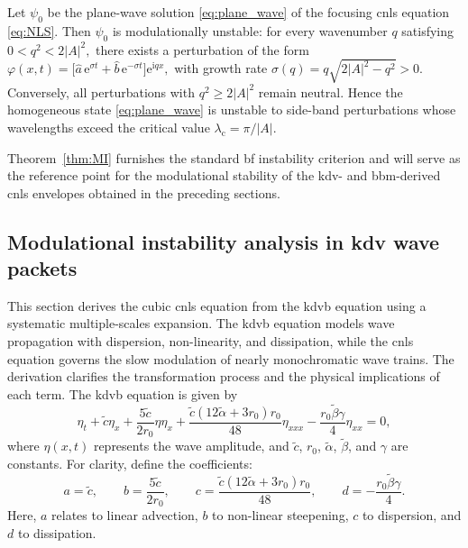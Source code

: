 \documentclass[alpha-refs, 12pt]{wiley-article}
\begin{document}
\begin{theorem}\label{thm:MI}
  Let $\psi_{0}$ be the plane-wave solution \eqref{eq:plane_wave} of the
  focusing \acrshort{cnls} equation \eqref{eq:NLS}. Then $\psi_{0}$ is modulationally unstable: for every wavenumber $q$ satisfying
  \(
    0<q^{2}<2|A|^{2},
  \)
  there exists a perturbation of the form
  \(
    \displaystyle
    \varphi(x,t)=\bigl[\hat{a}\,\mathrm{e}^{\sigma t}
                     +\hat{b}\,\mathrm{e}^{-\sigma t}\bigr]
                 \mathrm{e}^{\mathrm{i}qx},
  \)
  with growth rate
  \(
    \displaystyle
    \sigma(q)=q\sqrt{2|A|^{2}-q^{2}}>0.
  \)
  Conversely, all perturbations with $q^{2}\ge2|A|^{2}$ remain
  neutral. Hence the homogeneous state \eqref{eq:plane_wave} is unstable
  to side-band perturbations whose wavelengths exceed the critical value
  \(
    \lambda_{\mathrm{c}}=\pi/|A|.
  \)
\end{theorem}
Theorem~\ref{thm:MI} furnishes the standard \acrlong{bf} instability criterion and will serve as the reference point for the modulational stability of the \acrshort{kdv}- and \acrshort{bbm}-derived \acrshort{cnls} envelopes obtained in the preceding sections.

\subsection{Modulational instability analysis in \acrshort{kdv} wave packets}

This section derives the cubic \acrfull{cnls} equation from the \acrfull{kdvb} equation using a systematic multiple-scales expansion. The \acrshort{kdvb} equation models wave propagation with dispersion, non-linearity, and dissipation, while the \acrshort{cnls} equation governs the slow modulation of nearly monochromatic wave trains. The derivation clarifies the transformation process and the physical implications of each term. The \acrshort{kdvb} equation is given by
\begin{equation}
  \eta_{t} + \tilde{c} \eta_{x} + \frac{5 \tilde{c}}{2 r_{0}} \eta \eta_{x} + \frac{\tilde{c} (12 \tilde{\alpha} + 3 r_{0}) r_{0}}{48} \eta_{xxx} - \frac{r_{0} \tilde{\beta} \gamma}{4} \eta_{xx} = 0,
  \label{eq:kdv_burgers}
\end{equation}
where \(\eta(x,t)\) represents the wave amplitude, and \(\tilde{c}\), \(r_{0}\), \(\tilde{\alpha}\), \(\tilde{\beta}\), and \(\gamma\) are constants. For clarity, define the coefficients:
\begin{equation}
  a = \tilde{c}, \qquad b = \frac{5 \tilde{c}}{2 r_{0}}, \qquad c = \frac{\tilde{c} (12 \tilde{\alpha} + 3 r_{0}) r_{0}}{48}, \qquad d = -\frac{r_{0} \tilde{\beta} \gamma}{4}.
  \label{eq:coeffs}
\end{equation}
Here, \(a\) relates to linear advection, \(b\) to non-linear steepening, \(c\) to dispersion, and \(d\) to dissipation.
\end{document}

